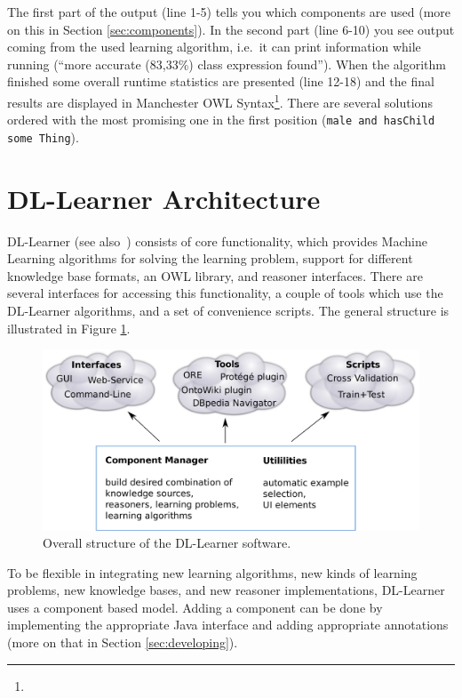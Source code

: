 \documentclass[a4paper,12pt]{scrartcl}
\begin{document}
The first part of the output (line 1-5) tells you which components are used (more on this in Section \ref{sec:components}). In the second part (line 6-10) you see output coming from the used learning algorithm, i.e.~it can print information while running (``more accurate (83,33\%) class expression found''). When the algorithm finished some overall runtime statistics are presented (line 12-18) and the final results are displayed in Manchester OWL Syntax\footnote{\mos}. There are several solutions ordered with the most promising one in the first position (\verb|male and hasChild some Thing|).

\section{DL-Learner Architecture}

DL-Learner (see also~\cite{dllearner_jmlr}) consists of core functionality, which provides Machine Learning algorithms for solving the learning problem, support for different knowledge base formats, an OWL library, and reasoner interfaces. There are several interfaces for accessing this functionality, a couple of tools which use the DL-Learner algorithms, and a set of convenience scripts. The general structure is illustrated in Figure \ref{fig:structure}.

\begin{figure}
 \includegraphics[width=\textwidth]{structure_print}
 \caption{Overall structure of the DL-Learner software.}
 \label{fig:structure}
\end{figure}

To be flexible in integrating new learning algorithms, new kinds of learning problems, new knowledge bases, and new reasoner implementations, DL-Learner uses a component based model. Adding a component can be done by implementing the appropriate Java interface and adding appropriate annotations (more on that in Section \ref{sec:developing}).
\end{document}
